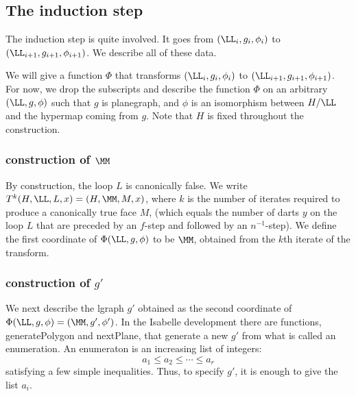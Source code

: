 


\subsection{The induction step}

The induction step is quite involved.  It goes from
$(\LL_i,g_i,\phi_i)$ to $(\LL_{i+1},g_{i+1},\phi_{i+1})$.
We describe all of these data.

We will give a function $\Phi$ that transforms $(\LL_i,g_i,\phi_i)$ to
$(\LL_{i+1},g_{i+1},\phi_{i+1})$.  For now, we drop the subscripts and
describe the function $\Phi$ on an arbitrary $(\LL,g,\phi)$ such that
$g$ is planegraph, and $\phi$ is an isomorphism between $H/\LL$ and
the hypermap coming from $g$.  Note that $H$ is fixed throughout the
construction.

\subsubsection{construction of $\MM$}

By construction, the loop $L$ is canonically false.
We write $T^k(H,\LL,L,x) = (H,\MM,M,x)$, where $k$ is
the number of iterates required to produce a canonically
true face $M$, (which equals the number of darts $y$ 
on the loop $L$
that are preceded by an $f$-step and followed by an $n^{-1}$-step).
We define the first coordinate of $\Phi(\LL,g,\phi)$ to be $\MM$,
obtained from the $k$th iterate of the transform.

\subsubsection{construction of $g'$}

We next describe the lgraph $g'$ obtained as the second
coordinate of $\Phi(\LL,g,\phi) = (\MM,g',\phi')$.  
In the Isabelle development there are functions, generatePolygon
and nextPlane, that generate a new $g'$ from what is called
an enumeration.  An enumeraton is an increasing list of integers:
\[
a_1\le a_2\le\cdots \le a_r
\]
satisfying a few simple inequalities.   
Thus, to specify $g'$, it is enough to give the list $a_i$.

